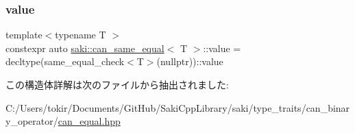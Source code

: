 \subsubsection{\texorpdfstring{value}{value}}
{\footnotesize\ttfamily template$<$typename T $>$ \\
constexpr auto \mbox{\hyperlink{structsaki_1_1can__same__equal}{saki\+::can\+\_\+same\+\_\+equal}}$<$ T $>$\+::value = decltype(same\+\_\+equal\+\_\+check$<$T$>$(nullptr))\+::value\hspace{0.3cm}{\ttfamily [static]}}



この構造体詳解は次のファイルから抽出されました\+:\begin{DoxyCompactItemize}
\item 
C\+:/\+Users/tokir/\+Documents/\+Git\+Hub/\+Saki\+Cpp\+Library/saki/type\+\_\+traits/can\+\_\+binary\+\_\+operator/\mbox{\hyperlink{can__equal_8hpp}{can\+\_\+equal.\+hpp}}\end{DoxyCompactItemize}
